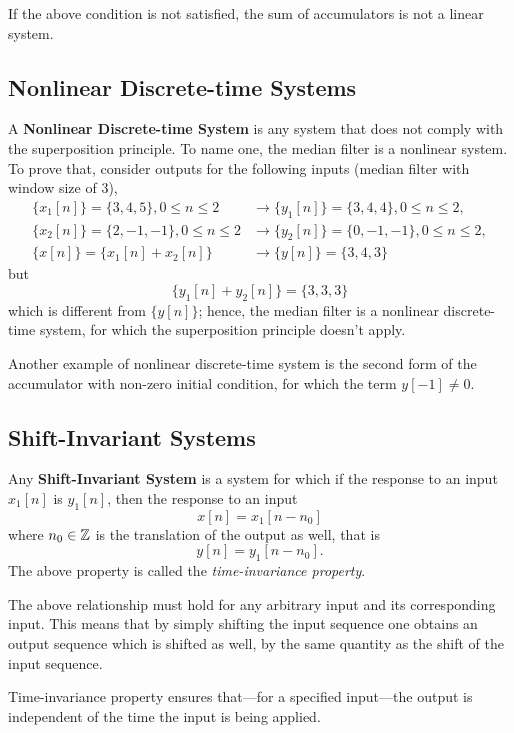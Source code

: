 \documentclass[\documentfontsize, twocolumn]{\classname}
\begin{document}
If the above condition is not satisfied, the sum of accumulators is not a linear system.

\subsection{Nonlinear Discrete-time Systems}

A \textbf{Nonlinear Discrete-time System} is any system that does not comply with the superposition principle. To name one, the median filter is a nonlinear system. To prove that, consider outputs for the following inputs (median filter with window size of $3$),
\begin{align*}
    \{x_1[n]\} = \{3,4,5\}, 0 \leq n \leq 2 &\longrightarrow \{y_1[n]\}=\{3,4,4\}, 0 \leq n \leq 2,\\
    \{x_2[n]\} = \{2,-1,-1\}, 0 \leq n \leq 2 &\longrightarrow \{y_2[n]\}=\{0,-1,-1\}, 0 \leq n \leq 2,\\
    \{x[n]\} = \{x_1[n] + x_2[n]\} &\longrightarrow \{y[n]\}=\{3,4,3\}
\end{align*}
but
\[\{y_1[n] + y_2[n]\} = \{3, 3, 3\}\]
which is different from $\{y[n]\}$; hence, the median filter is a nonlinear discrete-time system, for which the superposition principle doesn't apply.

Another example of nonlinear discrete-time system is the second form of the accumulator with non-zero initial condition, for which the term $y[-1] \neq 0$.

\subsection{Shift-Invariant Systems}

Any \textbf{Shift-Invariant System} is a system for which if the response to an input $x_1[n]$ is $y_1[n]$, then the response to an input \[x[n] = x_1[n-n_0]\] where $n_0 \in \mathbb Z$ is the translation of the output as well, that is \[y[n] = y_1[n-n_0].\] The above property is called the \emph{time-invariance property}.

The above relationship must hold for any arbitrary input and its corresponding input. This means that by simply shifting the input sequence one obtains an output sequence which is shifted as well, by the same quantity as the shift of the input sequence.

Time-invariance property ensures that---for a specified input---the output is independent of the time the input is being applied.
\end{document}
